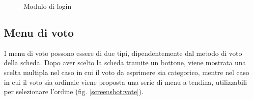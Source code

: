 \begin{figure}
	\centering
	\caption{Modulo di login}
	\label{screenshot:login}
\end{figure}

\subsection{Menu di voto}
I menu di voto possono essere di due tipi, dipendentemente dal metodo di voto della scheda. Dopo aver scelto la scheda tramite un bottone, viene mostrata una scelta multipla nel caso in cui il voto da esprimere sia categorico, mentre nel caso in cui il voto sia ordinale viene proposta una serie di menu a tendina, utilizzabili per selezionare l'ordine (fig. \ref{screenshot:vote}).

